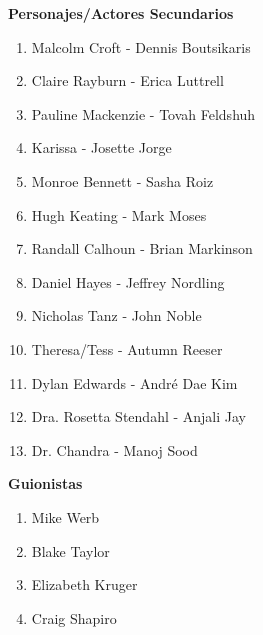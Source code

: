\documentclass[a5paper,11pt]{article}
\begin{document}
{\begin{enumerate}
\end{enumerate}  


    \setlength{\parindent}{0pt}\HandRight\textbf{ Personajes/Actores Secundarios}

\begin{enumerate}

     \item Malcolm Croft - Dennis Boutsikaris
     \item Claire Rayburn - Erica Luttrell
     \item Pauline Mackenzie - Tovah Feldshuh
     \item Karissa - Josette Jorge 
     \item Monroe Bennett - Sasha Roiz
     \item Hugh Keating - Mark Moses 
     \item Randall Calhoun - Brian Markinson
     \item Daniel Hayes - Jeffrey Nordling
     \item Nicholas Tanz - John Noble 
     \item Theresa/Tess - Autumn Reeser
     \item Dylan Edwards - André Dae Kim 
     \item Dra. Rosetta Stendahl - Anjali Jay 
     \item Dr. Chandra - Manoj Sood 

\end{enumerate}    

    \setlength{\parindent}{0pt}\HandRight\textbf{ Guionistas}

\begin{enumerate}

     \item Mike Werb
     \item Blake Taylor
     \item Elizabeth Kruger
     \item Craig Shapiro

\end{enumerate}    
    }
    
\end{document}
